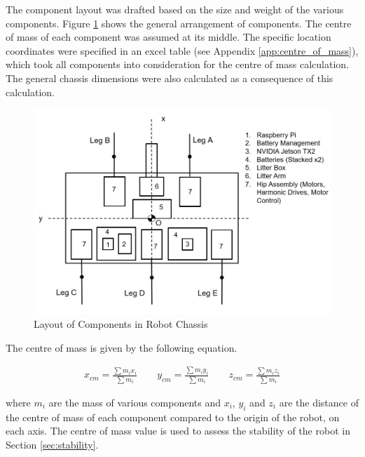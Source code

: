 The component layout was drafted based on the size and weight of the various components. Figure \ref{fig:component_layout} shows the general arrangement of components. The centre of mass of each component was assumed at its middle. The specific location coordinates were specified in an excel table (see Appendix \ref{app:centre_of_mass}), which took all components into consideration for the centre of mass calculation. The general chassis dimensions were also calculated as a consequence of this calculation.

\begin{figure}
    \centering
    \includegraphics{4_ComponentProperties/img/component_layout.JPG}
    \caption{Layout of Components in Robot Chassis}
    \label{fig:component_layout}
\end{figure}

The centre of mass is given by the following equation. 

\begin{gather}
    x_{cm} = \frac{\sum m_i x_i}{\sum m_i}
    \hspace{2em}
    y_{cm} = \frac{\sum m_i y_i}{\sum m_i}
    \hspace{2em}
    z_{cm} = \frac{\sum m_i z_i}{\sum m_i}
\end{gather}

where $m_i$ are the mass of various components and $x_i$, $y_i$ and $z_i$ are the distance of the centre of mass of each component compared to the origin of the robot, on each axis. The centre of mass value is used to assess the stability of the robot in Section \ref{sec:stability}.
